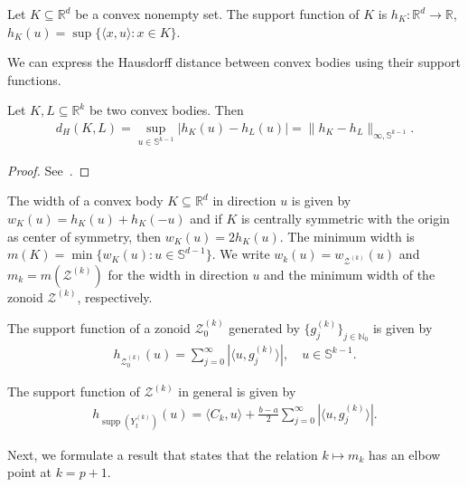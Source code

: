 \begin{Def}
    Let $K\subseteq\mathbb{R}^{d}$ be a convex nonempty set. The support function of $K$ is $h_K:\mathbb{R}^d\to\mathbb{R}$, $h_K(u)=\sup\{\langle x,u\rangle:x\in K\}$.
\end{Def}

We can express the Hausdorff distance between convex bodies using their support functions.

\begin{Lem}\label{lem:hausdorff_distance_between_convex_bodies}
    Let $K,L\subseteq\mathbb{R}^k$ be two convex bodies. Then
    \begin{align*}
        d_H(K,L)=\sup_{u\in\mathbb{S}^{k-1}}|h_{K}(u)-h_{L}(u)|=\|h_K-h_L\|_{\infty,\mathbb{S}^{k-1}}.
    \end{align*}
\end{Lem}

\begin{proof}
    See~\cite[Section 4]{GRUBER1993301}.
\end{proof}

The width of a convex body $K\subseteq\mathbb{R}^{d}$ in direction $u$ is given by $w_K(u)=h_K(u)+h_K(-u)$ and if $K$ is centrally symmetric with the origin as center of symmetry, then $w_K(u)=2h_K(u)$. The minimum width is $m(K)=\min\{w_K(u):u\in\mathbb{S}^{d-1}\}$. We write $w_k(u)=w_{\mathcal{Z}^{(k)}}(u)$ and $m_k=m(\mathcal{Z}^{(k)})$ for the width in direction $u$ and the minimum width of the zonoid $\mathcal{Z}^{(k)}$, respectively.

The support function of a zonoid $\mathcal{Z}^{(k)}_0$ generated by $\{g_j^{(k)}\}_{j\in\mathbb{N}_0}$ is given by
\begin{align*}
    h_{\mathcal{Z}^{(k)}_0}(u)=\sum_{j=0}^{\infty}|\langle u,g_j^{(k)}\rangle|,\quad u\in\mathbb{S}^{k-1}.
\end{align*}

The support function of $\mathcal{Z}^{(k)}$ in general is given by
\begin{align*}
    h_{\operatorname{supp}(Y_t^{(k)})}(u)=\langle C_k,u\rangle+\frac{b-a}{2}\sum_{j=0}^{\infty}|\langle u,g_j^{(k)}\rangle|.
\end{align*}

Next, we formulate a result that states that the relation $k\mapsto m_k$ has an elbow point at $k=p+1$.

